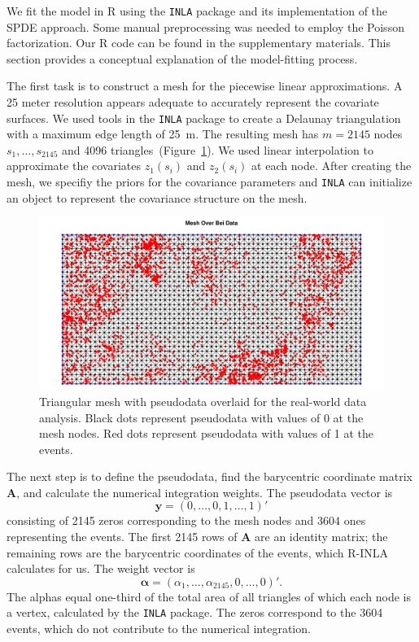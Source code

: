 \documentclass[]{interact}
\begin{document}
We fit the model in R using the \texttt{INLA} package and its implementation of
the SPDE approach. Some manual preprocessing was needed to employ the Poisson
factorization. Our R code can be found in the supplementary materials. This
section provides a conceptual explanation of the model-fitting process.

The first task is to construct a mesh for the piecewise linear approximations.
A 25 meter resolution appears adequate to accurately represent the covariate
surfaces. We used tools in the \texttt{INLA} package to create a Delaunay
triangulation with a maximum edge length of 25~m. The resulting mesh has
\(m = 2145\) nodes \(s_{1},  \dots, s_{2145}\) and 4096
triangles~(Figure~\ref{beimesh}). We used linear interpolation to approximate
the covariates \(z_{1}(s_{i})\) and \(z_{2}(s_{i})\) at each node. After
creating the mesh, we specifiy the priors for the covariance parameters and
\texttt{INLA} can initialize an object to represent the covariance structure
on the mesh.

\begin{figure}[t]
\includegraphics[width=\textwidth]{figures/bei_mesh.pdf}
\caption{Triangular mesh with pseudodata overlaid for the real-world data
analysis. Black dots represent pseudodata with values of 0 at the mesh nodes.
Red dots represent pseudodata with values of 1 at the events.}
\label{beimesh}
\end{figure}

The next step is to define the pseudodata, find the barycentric coordinate
matrix \(\mathbf{A}\), and calculate the numerical integration weights. The
pseudodata vector is
\begin{displaymath}
\mathbf{y} = (0, \dots, 0, 1, \dots, 1)'
\end{displaymath}
consisting of 2145 zeros corresponding to the mesh nodes and 3604 ones
representing the events. The first 2145 rows of \(\mathbf{A}\) are an
identity matrix; the remaining rows are the barycentric coordinates of the
events, which R-INLA calculates for us. The weight vector is
\begin{displaymath}
\boldsymbol{\alpha} = (\alpha_{1}, \dots, \alpha_{2145}, 0, \dots, 0)'.
\end{displaymath}
The alphas equal one-third of the total area of all triangles of which each
node is a vertex, calculated by the \texttt{INLA} package. The zeros
correspond to the 3604 events, which do not contribute to the numerical
integration.
\end{document}
